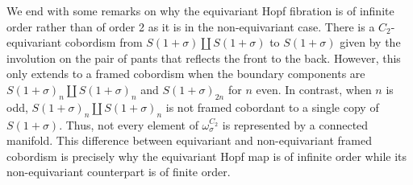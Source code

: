 \documentclass[11pt]{amsart}
\theoremstyle{plain}   %
\theoremstyle{definition}
\theoremstyle{remark}
\numberwithin{equation}{section}
\begin{document}
We end with some remarks on why the equivariant Hopf fibration is of infinite order rather than of order 2 as it is in the non-equivariant case. There is a $C_2$-equivariant cobordism from $S(1+\sigma)\amalg S(1+\sigma)$ to $S(1+\sigma)$ given by the involution on the pair of pants that reflects the front to the back. However, this only extends to a framed cobordism when the boundary components are $S(1+\sigma)_n\amalg S(1+\sigma)_n$ and $S(1+\sigma)_{2n}$ for $n$ even. In contrast, when $n$ is odd, $S(1+\sigma)_n\amalg S(1+\sigma)_n$ is not framed cobordant to a single copy of $S(1+\sigma)$. Thus, not every element of $\omega_\sigma^{C_2}$ is represented by a connected manifold. This difference between equivariant and non-equivariant framed cobordism is precisely why the equivariant Hopf map is of infinite order while its non-equivariant counterpart is of finite order.



\end{document}
